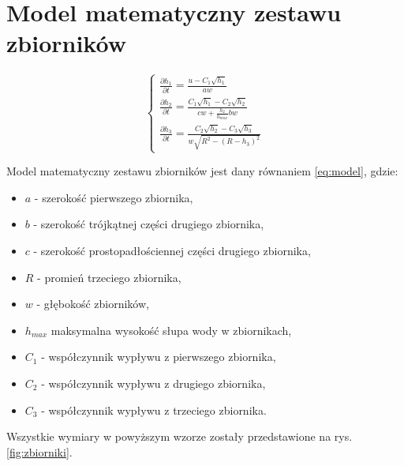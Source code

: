 \section{Model matematyczny zestawu zbiorników}
\label{sec:model}


\begin{equation}\label{eq:model}
	\left \{
	\begin{array}{lr}
		\frac{\partial h_{1}}{\partial t} = \frac{u - C_{1}\sqrt{h_{1}}}{aw} \\[8pt]
		\frac{\partial h_{2}}{\partial t} = \frac{C_{1}\sqrt{h_{1}} -  C_{2}\sqrt{h_{2}}}{cw + \frac{h_{2}}{h_{max}}bw} \\[20pt]
		\frac{\partial h_{3}}{\partial t} = \frac{C_{2}\sqrt{h_{2}} -  C_{3}\sqrt{h_{3}}}{w\sqrt{R^{2} - (R - h_{3})^{2}}}
	\end{array}
	\right.
\end{equation}

Model matematyczny zestawu zbiorników jest dany równaniem \ref{eq:model}, gdzie:
\begin{itemize}
	\item $a$ - szerokość pierwszego zbiornika,
	\item $b$ - szerokość trójkątnej części drugiego zbiornika,
	\item $c$ - szerokość prostopadłościennej części drugiego zbiornika,
	\item $R$ - promień trzeciego zbiornika,
	\item $w$ - głębokość zbiorników,
	\item $h_{max}$ maksymalna wysokość słupa wody w zbiornikach,
	\item $C_{1}$ - współczynnik wypływu z pierwszego zbiornika,
	\item $C_{2}$ - współczynnik wypływu z drugiego zbiornika,
	\item $C_{3}$ - współczynnik wypływu z trzeciego zbiornika.
\end{itemize}
Wszystkie wymiary w powyższym wzorze zostały przedstawione na rys. \ref{fig:zbiorniki}.